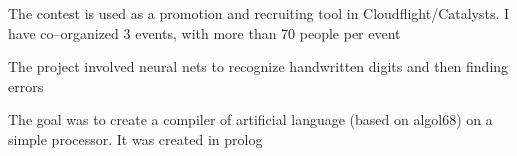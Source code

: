 \documentclass[10pt,a4paper,ragged2e,withhyper, normalphoto]{altacv}
\begin{document}
\begin{paracol}{2}




\divider
{}
\divider
{}










\medskip

    
    The contest is used as a promotion and recruiting tool in Cloudflight/Catalysts. I have co--organized 3 events, with more than 70 people per event
    
    \divider
    
    The project involved neural nets to recognize handwritten digits and then finding errors
    
    \divider
    
    The goal was to create a compiler of artificial language (based on algol68) on a simple processor. It was created in prolog

\medskip



 \\
       


\smallskip





\end{paracol}
\end{document}
